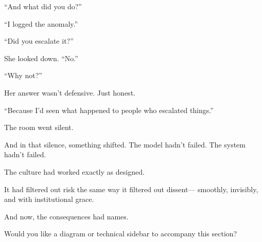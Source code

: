 “And what did you do?”

“I logged the anomaly.”

“Did you escalate it?”

She looked down.
“No.”

“Why not?”

Her answer wasn’t defensive. Just honest.

“Because I’d seen what happened to people who escalated things.”

The room went silent.

And in that silence, something shifted.
The model hadn’t failed.
The system hadn’t failed.

The culture had worked exactly as designed.

It had filtered out risk the same way it filtered out dissent—
smoothly, invisibly, and with institutional grace.

And now, the consequences had names.

Would you like a diagram or technical sidebar to accompany this section?

\medskip

